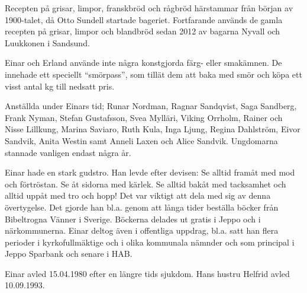 Recepten på grisar, limpor, franskbröd och rågbröd härstammar från början av 1900-talet, då Otto Sundell startade bageriet. Fortfarande används de gamla recepten på grisar, limpor och blandbröd sedan 2012 av bagarna Nyvall och Luukkonen i Sandsund.

Einar och Erland använde inte några konstgjorda färg- eller smakämnen. De innehade ett speciellt ``smörpass'', som tillät dem att baka med smör och köpa ett visst antal kg till nedsatt pris.

Anställda under Einars tid; Runar Nordman, Ragnar Sandqvist, Saga Sandberg, Frank Nyman, Stefan Gustafsson, Svea Mylläri, Viking Orrholm, Rainer och Nisse Lillkung, Marina Saviaro, Ruth Kula, Inga Ljung, Regina Dahlström, Eivor Sandvik, Anita Westin samt Anneli Laxen och Alice Sandvik.  Ungdomarna stannade vanligen endast några år.

Einar hade en stark gudstro. Han levde efter devisen: Se alltid framåt med mod och förtröstan. Se åt sidorna med kärlek. Se alltid bakåt med tacksamhet och alltid uppåt med tro och hopp! Det var viktigt att dela med sig av denna övertygelse. Det gjorde han bl.a. genom att långa tider beställa böcker från Bibeltrogna Vänner i Sverige. Böckerna delades ut gratis i Jeppo och i närkommunerna. Einar deltog även i offentliga uppdrag, bl.a. satt han flera perioder i kyrkofullmäktige och i olika kommunala nämnder och som principal i Jeppo Sparbank och senare i HAB.

Einar avled 15.04.1980 efter en längre tids sjukdom. Hans hustru Helfrid avled 10.09.1993.



